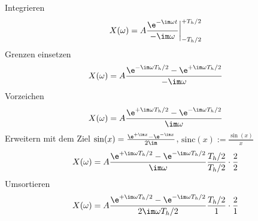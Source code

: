 \begin{ExCalc}
Integrieren
\begin{equation}
X(\omega) = A \frac{\e^{-\im \omega t}}{-\im \omega} \bigg|_{-T_h/2}^{+T_h/2}
\end{equation}
Grenzen einsetzen
\begin{equation}
X(\omega) = A \frac{\e^{-\im \omega T_h/2}-\e^{+\im \omega T_h/2}}{-\im \omega}
\end{equation}
Vorzeichen
\begin{equation}
X(\omega) = A \frac{\e^{+\im \omega T_h/2}-\e^{-\im \omega T_h/2}}{\im \omega}
\end{equation}
Erweitern mit dem Ziel $\sin(x) = \frac{\e^{+\im x}-\e^{-\im x}}{2\im}$, $\mathrm{sinc}(x):=\frac{\sin(x)}{x}$
\begin{equation}
X(\omega) = A \frac{\e^{+\im \omega T_h/2}-\e^{-\im \omega T_h/2}}{\im \omega} \frac{T_h/2}{T_h/2} \cdot \frac{2}{2}
\end{equation}
Umsortieren
\begin{equation}
X(\omega) = A \frac{\e^{+\im \omega T_h/2}-\e^{-\im \omega T_h/2}}{2 \im \omega T_h/2} \frac{T_h/2}{1} \cdot \frac{2}{1}
\end{equation}
\end{ExCalc}

